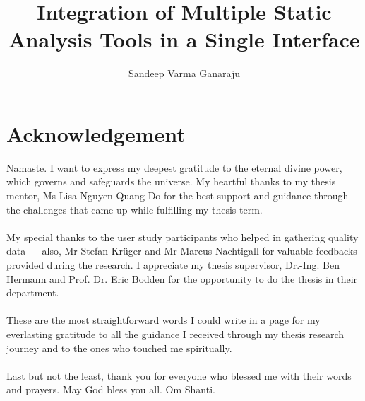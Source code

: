 \documentclass[]{upb_cs_thesis} %
\title{Integration of Multiple Static Analysis Tools in a Single Interface}
\author{Sandeep Varma Ganaraju}
\begin{document}
\cleardoublepage
\cleardoublepage

\chapter*{Acknowledgement}


\vspace*{\fill}
Namaste. I want to express my deepest gratitude to the eternal divine power, which governs and safeguards the universe. My heartful thanks to my thesis mentor, Ms Lisa Nguyen Quang Do for the best support and guidance through the challenges that came up while fulfilling my thesis term. \\ \\

My special thanks to the user study participants who helped in gathering quality data — also, Mr Stefan Krüger and Mr Marcus Nachtigall for valuable feedbacks provided during the research. I appreciate my thesis supervisor, Dr.-Ing. Ben Hermann and Prof. Dr. Eric Bodden for the opportunity to do the thesis in their department. \\ \\

These are the most straightforward words I could write in a page for my everlasting gratitude to all the guidance I received through my thesis research journey and to the ones who touched me spiritually. \\ \\

Last but not the least, thank you for everyone who blessed me with their words and prayers. May God bless you all. Om Shanti. \\ \\ \\ \\


\vspace*{\fill}
%

\cleardoublepage

\vspace*{\fill}
\begin{abstract}
	
\end{abstract}
\acresetall
\vspace*{\fill}
\cleardoublepage

\tableofcontents %
\end{document}
